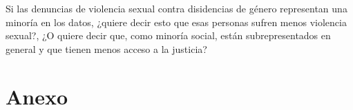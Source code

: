 \documentclass[10 pt]{article}
\begin{document}
Si las denuncias de violencia sexual contra disidencias de género representan una minoría en los datos, ¿quiere decir esto que esas personas sufren menos violencia sexual?, ¿O quiere decir que, como minoría social, están subrepresentados en general y que tienen menos acceso a la justicia?

\newpage




\newpage
\section*{Anexo}\label{anex}
\end{document}
